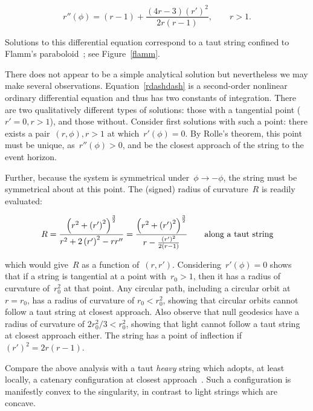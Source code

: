 \documentclass[prb,preprint]{revtex4-1}
\begin{document}
\begin{equation}\label{rdashdash}
  r''\left(\phi\right) =
  (r-1) + \frac{(4r-3)\left(r'\right)^2}{2r\left(r-1\right)},\qquad r>1.
\end{equation}

Solutions to this differential equation correspond to a taut string
confined to Flamm's paraboloid~\cite{flamm1916}; see
Figure~\ref{flamm}.

There does not appear to be a simple analytical solution but
nevertheless we may make several observations.
Equation~\ref{rdashdash} is a second-order nonlinear ordinary
differential equation and thus has two constants of integration.
There are two qualitatively different types of solutions: those with a
tangential point ($r'=0,r>1$), and those without.  Consider first
solutions with such a point: there exists a pair~$\left(r,\phi\right),
r>1$ at which~$r'(\phi)=0$.  By Rolle's theorem, this point must be
unique, as~$r''(\phi)>0$, and be the closest approach of the string to
the event horizon.

Further, because the system is symmetrical
under~$\phi\longrightarrow-\phi$, the string must be symmetrical about
at this point.  The (signed) radius of curvature~$R$ is readily
evaluated:

\begin{equation}\label{roc}
  R = \frac{
    \left(r^2 + \left(r'\right)^2\right)^\frac{3}{2}
  }{
    r^2 + 2\left(r'\right)^2-rr''
  }
  =
  \frac{
    \left(r^2 + \left(r'\right)^2\right)^\frac{3}{2}
  }{
    r-\frac{\left(r'\right)^2}{2\left(r-1\right)}
  }\qquad\mbox{along a taut string}
\end{equation}

\noindent which would give~$R$ as a function of~$\left(r,r'\right)$.
Considering~$r'(\phi)=0$ shows that if a string is tangential at a
point with~$r_0>1$, then it has a radius of curvature of~$r_0^2$ at
that point.  Any circular path, including a circular orbit at~$r=r_0$,
has a radius of curvature of $r_0<r_0^2$, showing that circular orbits
cannot follow a taut string at closest approach.  Also observe that
null geodesics have a radius of curvature of $2r_0^2/3 < r_0^2$,
showing that light cannot follow a taut string at closest approach
either.  The string has a point of inflection
if~$\left(r'\right)^2=2r(r-1)$.

Compare the above analysis with a taut {\em heavy} string which
adopts, at least locally, a catenary configuration at closest
approach~\cite{nguyen2007}.  Such a configuration is manifestly convex
to the singularity, in contrast to light strings which are concave.
\end{document}
